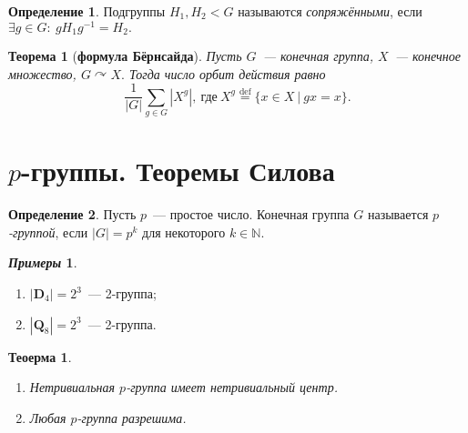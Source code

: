 \documentclass[a4paper, 14pt]{extarticle}
\newcommand{\deq}{\stackrel{\mathrm{def}}{=}}
\newcommand{\naturals}{\mathbb{N}}
\newcommand{\dihedral}{\mathbf{D}}
\theoremstyle{definition}
\newtheorem*{exmpls}{\textit{Примеры}}
\newtheorem{definition}{Определение}
\theoremstyle{plain}
\newtheorem{theorem}{Теоерма}
\newtheorem*{theorem*}{Теорема}
\numberwithin{theorem}{section}
\numberwithin{definition}{section}
\numberwithin{statement}{section}
\numberwithin{lemma}{section}
\numberwithin{consequence}{section}
\begin{document}
        \begin{definition}
            Подгруппы $H_1, H_2 < G$ называются \textit{сопряжёнными}, если $\exists g \in G{:} \ gH_1g^{-1} = H_2.$
        \end{definition}
        \begin{theorem*}[\textbf{формула Бёрнсайда}]
            Пусть $G$~--- конечная группа, $X$~--- конечное множество, ${G \curvearrowright X.}$ Тогда число орбит действия равно
            \begin{equation*}
                \frac{1}{|G|} \sum_{g \in G} |X^g|, \  \textrm{где} \ X^g \deq \{x \in X \ | \ gx = x\}.
            \end{equation*}
        \end{theorem*}
        
        \newpage
	\section{$p$-группы. Теоремы Силова}
	\setcounter{definition}{0}
        \begin{definition}
            Пусть $p$~--- простое число. Конечная группа $G$ называется \textit{$p$-группой}, если ${|G| = p^k}$ для некоторого ${k \in \naturals.}$
        \end{definition}
        \begin{exmpls}
            \
            \begin{enumerate}
            \setlength\itemsep{0.1em}
                \item ${|\dihedral_4| = 2^3}$~--- 2-группа;
                \item ${|\mathbf{Q}_8| = 2^3}$~--- 2-группа.
            \end{enumerate}
        \end{exmpls}
        \begin{theorem}
            \
            \begin{enumerate}
            \setlength\itemsep{0.1em}
                \item Нетривиальная $p$-группа имеет нетривиальный центр. 
                \item Любая $p$-группа разрешима.
            \end{enumerate}
        \end{theorem}
\end{document}

